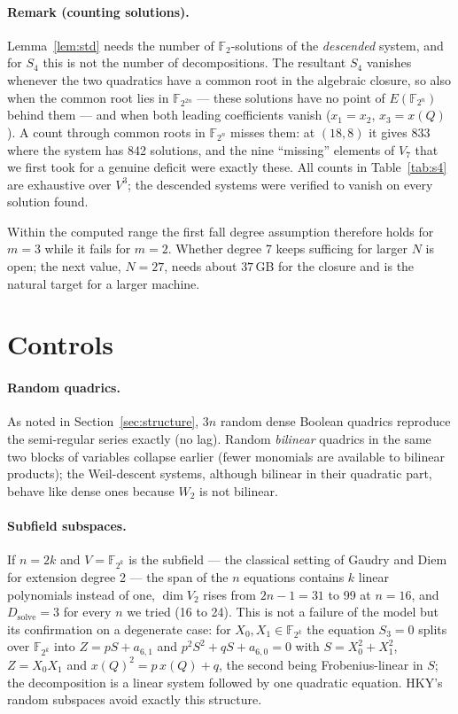 \documentclass[11pt,a4paper]{article}
\theoremstyle{remark}\newtheorem{remark}{Remark}
\newcommand{\F}{\mathbb{F}}
\newcommand{\Dsolve}{D_{\mathrm{solve}}}
\begin{document}
\paragraph{Remark (counting solutions).} Lemma~\ref{lem:std} needs the number of $\F_2$-solutions of the \emph{descended} system, and for $S_4$ this is not the number of decompositions. The resultant $S_4$ vanishes whenever the two quadratics have a common root in the algebraic closure, so also when the common root lies in $\F_{2^{2n}}$ --- these solutions have no point of $E(\F_{2^n})$ behind them --- and when both leading coefficients vanish ($x_1=x_2$, $x_3=x(Q)$). A count through common roots in $\F_{2^n}$ misses them: at $(18,8)$ it gives 833 where the system has 842 solutions, and the nine ``missing'' elements of $V_7$ that we first took for a genuine deficit were exactly these. All counts in Table~\ref{tab:s4} are exhaustive over $V^3$; the descended systems were verified to vanish on every solution found.

Within the computed range the first fall degree assumption therefore holds for $m=3$ while it fails for $m=2$. Whether degree 7 keeps sufficing for larger $N$ is open; the next value, $N=27$, needs about $37$\,GB for the closure and is the natural target for a larger machine.

\section{Controls}

\paragraph{Random quadrics.} As noted in Section~\ref{sec:structure}, $3n$ random dense Boolean quadrics reproduce the semi-regular series exactly (no lag). Random \emph{bilinear} quadrics in the same two blocks of variables collapse earlier (fewer monomials are available to bilinear products); the Weil-descent systems, although bilinear in their quadratic part, behave like dense ones because $W_2$ is not bilinear.

\paragraph{Subfield subspaces.} If $n=2k$ and $V=\F_{2^k}$ is the subfield --- the classical setting of Gaudry and Diem for extension degree 2 --- the span of the $n$ equations contains $k$ linear polynomials instead of one, $\dim V_2$ rises from $2n-1=31$ to 99 at $n=16$, and $\Dsolve=3$ for every $n$ we tried (16 to 24). This is not a failure of the model but its confirmation on a degenerate case: for $X_0,X_1\in\F_{2^k}$ the equation $S_3=0$ splits over $\F_{2^k}$ into $Z=pS+a_{6,1}$ and $p^2S^2+qS+a_{6,0}=0$ with $S=X_0^2+X_1^2$, $Z=X_0X_1$ and $x(Q)^2=p\,x(Q)+q$, the second being Frobenius-linear in $S$; the decomposition is a linear system followed by one quadratic equation. HKY's random subspaces avoid exactly this structure.
\end{document}
